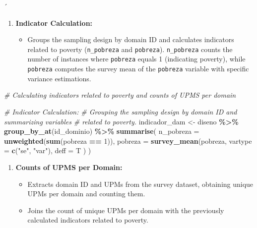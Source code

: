 \documentclass[
  12pt,
]{book}
\newenvironment{Shaded}{\begin{snugshade}}{\end{snugshade}}
\newcommand{\AttributeTok}[1]{\textcolor[rgb]{0.13,0.29,0.53}{#1}}
\newcommand{\CommentTok}[1]{\textcolor[rgb]{0.56,0.35,0.01}{\textit{#1}}}
\newcommand{\DecValTok}[1]{\textcolor[rgb]{0.00,0.00,0.81}{#1}}
\newcommand{\FunctionTok}[1]{\textcolor[rgb]{0.13,0.29,0.53}{\textbf{#1}}}
\newcommand{\NormalTok}[1]{#1}
\newcommand{\OtherTok}[1]{\textcolor[rgb]{0.56,0.35,0.01}{#1}}
\newcommand{\SpecialCharTok}[1]{\textcolor[rgb]{0.81,0.36,0.00}{\textbf{#1}}}
\newcommand{\StringTok}[1]{\textcolor[rgb]{0.31,0.60,0.02}{#1}}
\providecommand{\tightlist}{%
  \setlength{\itemsep}{0pt}\setlength{\parskip}{0pt}}
\begin{document}
´

\begin{enumerate}
\def\labelenumi{\arabic{enumi}.}
\tightlist
\item
  \textbf{Indicator Calculation:}

  \begin{itemize}
  \tightlist
  \item
    Groups the sampling design by domain ID and calculates indicators related to poverty (\texttt{n\_pobreza} and \texttt{pobreza}). \texttt{n\_pobreza} counts the number of instances where \texttt{pobreza} equals 1 (indicating poverty), while \texttt{pobreza} computes the survey mean of the \texttt{pobreza} variable with specific variance estimations.
  \end{itemize}
\end{enumerate}

\begin{Shaded}
\begin{Highlighting}[]
\CommentTok{\# Calculating indicators related to poverty and counts of UPMS per domain}

\CommentTok{\# Indicator Calculation:}
\CommentTok{\# Grouping the sampling design by domain ID and summarizing variables }
\CommentTok{\# related to poverty.}
\NormalTok{indicador\_dam }\OtherTok{\textless{}{-}}
\NormalTok{  diseno }\SpecialCharTok{\%\textgreater{}\%} \FunctionTok{group\_by\_at}\NormalTok{(id\_dominio) }\SpecialCharTok{\%\textgreater{}\%} 
  \FunctionTok{summarise}\NormalTok{(}
    \AttributeTok{n\_pobreza =} \FunctionTok{unweighted}\NormalTok{(}\FunctionTok{sum}\NormalTok{(pobreza }\SpecialCharTok{==} \DecValTok{1}\NormalTok{)),}
    \AttributeTok{pobreza =} \FunctionTok{survey\_mean}\NormalTok{(pobreza,}
                          \AttributeTok{vartype =} \FunctionTok{c}\NormalTok{(}\StringTok{"se"}\NormalTok{,  }\StringTok{"var"}\NormalTok{),}
                          \AttributeTok{deff =}\NormalTok{ T}
\NormalTok{    )}
\NormalTok{  )}
\end{Highlighting}
\end{Shaded}

\begin{enumerate}
\def\labelenumi{\arabic{enumi}.}
\setcounter{enumi}{1}
\tightlist
\item
  \textbf{Counts of UPMS per Domain:}

  \begin{itemize}
  \tightlist
  \item
    Extracts domain ID and UPMs from the survey dataset, obtaining unique UPMs per domain and counting them.
  \item
    Joins the count of unique UPMs per domain with the previously calculated indicators related to poverty.
  \end{itemize}
\end{enumerate}
\end{document}

